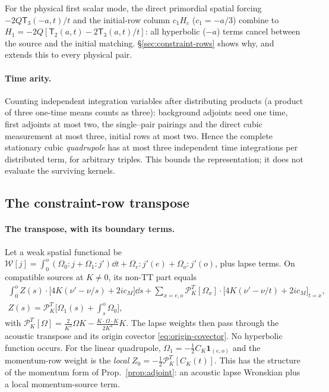 For the physical first scalar mode, the direct primordial spatial forcing
$-2Q\mathsf T_3(-a,t)/t$ and the initial-row column $c_1H_c$ ($c_1=-a/3$) combine to
$H_1=-2Q[\mathsf T_2(a,t)-2\mathsf T_3(a,t)/t]$: all hyperbolic ($-a$) terms cancel between the source and
the initial matching. \S\ref{sec:constraint-rows} shows why, and extends this to every physical
pair.

\paragraph{Time arity.} Counting independent integration variables after distributing products
(a product of three one-time means counts as three): background adjoints need one time, first
adjoints at most two, the single--pair pairings and the direct cubic measurement at most three,
initial rows at most two. Hence the complete stationary cubic \emph{quadrupole} has at most three
independent time integrations per distributed term, for arbitrary triples. This bounds the
representation; it does not evaluate the surviving kernels.

\subsection{The constraint-row transpose}
\paragraph{The transpose, with its boundary terms.} Let a weak spatial functional be
$\mathcal W[j]=\int_0^o(\Omega_0:j+\Omega_1:j')\dd t+\Omega_e:j'(e)+\Omega_o:j'(o)$, plus lapse terms. On
compatible sources at $K\neq0$, its non-TT part equals
\begin{equation}\label{eq:constraint-transpose}
\begin{gathered}
 \int_0^oZ(s)\cdot\big[4K(\nu'-\nu/s)+2ic_M\big]\dd s
 +\sum_{x=e,o}\mathcal P_K^T[\Omega_x]\cdot\big[4K(\nu'-\nu/t)+2ic_M\big]_{t=x},\\
 Z(s)=\mathcal P_K^T\Big[\Omega_1(s)+\int_s^o\Omega_0\Big],
\end{gathered}
\end{equation}
with $\mathcal P_K^T[\Omega]=\frac2{K^2}\Omega K-\frac{K\cdot\Omega\cdot K}{2K^4}K$. The lapse weights then
pass through the acoustic transpose and its origin covector \eqref{eq:origin-covector}. No
hyperbolic function occurs. For the linear quadrupole, $\Omega_1=-\frac12C_K\mathbf 1_{(e,o)}$ and the
momentum-row weight is the \emph{local} $Z_0=-\frac12\mathcal P_K^T[C_K(t)]$. This has the
structure of the momentum form of Prop.~\ref{prop:adjoint}: an acoustic lapse Wronskian plus a
local momentum-source term.

